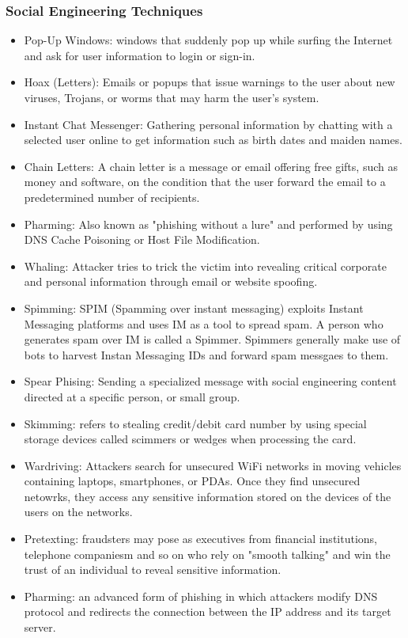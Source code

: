 \subsubsection{Social Engineering Techniques}
\begin{itemize}
    \item Pop-Up Windows: windows that suddenly pop up while surfing the Internet and ask for user information to login or sign-in.
    \item Hoax (Letters): Emails or popups that issue warnings to the user about new viruses, Trojans, or worms that may harm the user's system.
    \item Instant Chat Messenger: Gathering personal information by chatting with a selected user online to get information such as birth dates and maiden names.
    \item Chain Letters: A chain letter is a message or email offering free gifts, such as money and software, on the condition that the user forward the email to a predetermined number of recipients.
    \item Pharming: Also known as "phishing without a lure" and performed by using DNS Cache Poisoning or Host File Modification.
    \item Whaling: Attacker tries to trick the victim into revealing critical corporate and personal information through email or website spoofing.
    \item Spimming: SPIM (Spamming over instant messaging) exploits Instant Messaging platforms and uses IM as a tool to spread spam. A person who generates spam over IM is called a Spimmer. Spimmers generally make use of bots to harvest Instan Messaging IDs and forward spam messgaes to them.
    \item Spear Phising: Sending a specialized message with social engineering content directed at a specific person, or small group.
    \item Skimming: refers to stealing credit/debit card number by using special storage devices called scimmers or wedges when processing the card.
    \item Wardriving: Attackers search for unsecured WiFi networks in moving vehicles containing laptops, smartphones, or PDAs. Once they find unsecured netowrks, they access any sensitive information stored on the devices of the users on the networks.
    \item Pretexting: fraudsters may pose as executives from financial institutions, telephone companiesm and so on who rely on "smooth talking" and win the trust of an individual to reveal sensitive information.
    \item Pharming: an advanced form of phishing in which attackers modify DNS protocol and redirects the connection between the IP address and its target server.
\end{itemize}
